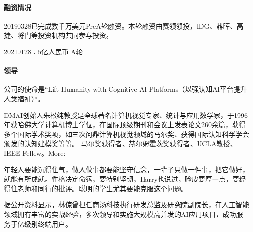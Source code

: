 \documentclass[letterpaper,11pt,english]{sphinxmanual}
\begin{document}
\paragraph{融资情况}
\label{\detokenize{chapter_company/dm-ai:id5}}

2019\sphinxhyphen{}03\sphinxhyphen{}28已完成数千万美元Pre\sphinxhyphen{}A轮融资。本轮融资由赛领领投，IDG、鼎晖、高捷、将门等投资机构共同参与投资。

2021\sphinxhyphen{}01\sphinxhyphen{}28：5亿人民币 A轮


\paragraph{领导}
\label{\detokenize{chapter_company/dm-ai:id6}}
公司的使命是“Lift Humanity with Cognitive AI
Platforms（以强认知AI平台提升人类福祉）”。

DMAI创始人朱松纯教授是全球著名计算机视觉专家、统计与应用数学家，于1996年获哈佛大学计算机博士学位，在国际顶级期刊和会议上发表论文260余篇，获得多个国际学术奖项，如三次问鼎计算机视觉领域的马尔奖、获得国际认知科学学会颁发的认知建模奖等等。
马尔奖获得者、赫尔姆霍茨奖获得者、UCLA教授、IEEE
Fellow。More:%
\begin{footnote}[888]\sphinxAtStartFootnote
{}
%
\end{footnote}

年轻人要能沉得住气，做人做事都要能坚守信念，一辈子只做一件事，把它做好，就能有所成就。性格决定命运，要特别坚韧，Harry也说过，脸皮要厚一点，要经得住老师和同行的批评。聪明的学生尤其要能克服这个问题。

据公开资料显示，林倞曾担任商汤科技执行研发总监及研究院副院长，在人工智能领域拥有丰富的实战经验，多次领导和实施大规模高并发的AI应用项目，成功服务于亿级别终端用户。
%
\begin{footnote}[889]\sphinxAtStartFootnote
{}
%
\end{footnote}
\end{document}

